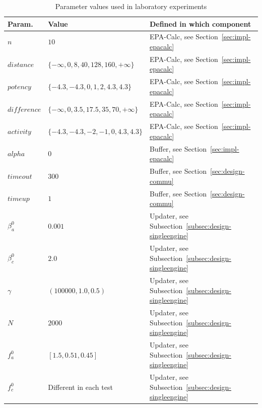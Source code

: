 %
\begin{table}
\centering
\caption{Parameter values used in laboratory experiments}
\label{table:param-setting}
\begin{tabular}{| l | l | l |}
\hline
\textbf{Param.} & \textbf{Value} & \textbf{Defined in which component} \\ \hline
$n$ & $10$ & EPA-Calc, see Section~\ref{sec:impl-epacalc} \\ \hline
$distance$ & $\{-\infty, 0, 8, 40, 128, 160, +\infty\}$ & EPA-Calc, see Section~\ref{sec:impl-epacalc} \\ \hline
$potency$ & $\{-4.3, -4.3, 0, 1, 2, 4.3, 4.3\}$ & EPA-Calc, see Section~\ref{sec:impl-epacalc}  \\ \hline 
$difference$ & $\{-\infty, 0, 3.5, 17.5, 35, 70, +\infty\}$ & EPA-Calc, see Section~\ref{sec:impl-epacalc}  \\ \hline
$activity$ & $\{-4.3, -4.3, -2, -1, 0, 4.3, 4.3\}$ & EPA-Calc, see Section~\ref{sec:impl-epacalc}  \\ \hline
$alpha$ & $0$ & Buffer, see Section~\ref{sec:impl-epacalc}  \\ \hline
$timeout$ & $300$ & Buffer, see Section~\ref{sec:design-commu} \\ \hline
$timeup$ & $1$ & Buffer, see Section~\ref{sec:design-commu} \\ \hline
$\beta_{a}^{0}$ & $0.001$ & Updater, see Subsection~\ref{subsec:design-singleengine} \\ \hline
$\beta_{c}^{0}$ & $2.0$ & Updater, see Subsection~\ref{subsec:design-singleengine} \\ \hline
$\gamma$ & $(100000, 1.0, 0.5)$ & Updater, see Subsection~\ref{subsec:design-singleengine} \\ \hline
$N$ & $2000$ & Updater, see Subsection~\ref{subsec:design-singleengine} \\ \hline
$f_a^{0}$ & $[1.5, 0.51, 0.45]$ & Updater, see Subsection~\ref{subsec:design-singleengine} \\ \hline
$f_c^{0}$ & Different in each test &Updater, see Subsection~\ref{subsec:design-singleengine} \\ \hline
\end{tabular}
\end{table}

